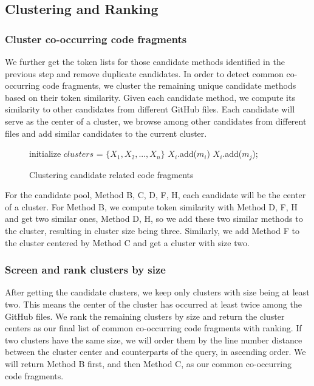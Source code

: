 \subsection{Clustering and Ranking}
\subsubsection{Cluster co-occurring code fragments}
We further get the token lists for those candidate methods identified in the previous step and remove duplicate candidates. In order to detect common co-occurring code fragments, we cluster the remaining unique candidate methods
based on their token similarity. Given each candidate method, we compute its similarity to other candidates from different GitHub files. Each candidate will serve as the center of a cluster, we browse among other candidates from different files and add similar candidates to the current cluster.

\begin{figure}[h]
	\label{alg: Clustering candidate related methods}
	\removelatexerror
	\begin{algorithm}[H]
		\caption{Clustering candidate related code fragments}
		initialize $clusters$ = $\{X_1, X_2,..., X_n\}$\;
		{
			$X_i$.add($m_i$) \;
			{
				{
					{
						$X_i$.add($m_j$);
					}
				}
			} 
		}
	\end{algorithm}
\end{figure}

For the candidate pool, {\ttt Method B, C, D, F, H}, each candidate will be the center of a cluster. For {\ttt Method B}, we compute token similarity with {\ttt Method D, F, H} and get two similar ones, {\ttt Method D, H}, so we add these two similar methods to the cluster, resulting in cluster size being three. Similarly, we add {\ttt Method F} to the cluster centered by {\ttt Method C} and get a cluster with size two.

\subsubsection{Screen and rank clusters by size}
After getting the candidate clusters, we keep only clusters with size being at least two. This means the center of the cluster has occurred at least twice among the GitHub files.
We rank the remaining clusters by size and return the cluster centers as our final list of common co-occurring code fragments with ranking. If two clusters have the same size, we will order them by the line number distance between the cluster center and counterparts of the query, in ascending order. We will return {\ttt Method B} first, and then {\ttt Method C}, as our common co-occurring code fragments.